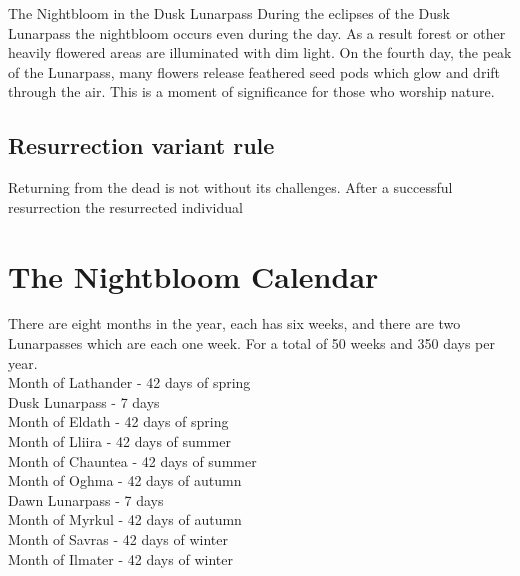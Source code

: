 \documentclass[10pt,twoside,twocolumn,openany,justified,bg=full,nomultitoc]{dndbook}
\begin{document}
\begin{commentbox}{The Nightbloom in the Dusk Lunarpass}\label{The-Nightbloom-in-the-Dusk-Lunarpass}
During the eclipses of the Dusk Lunarpass the nightbloom occurs even during the day. As a result forest or other heavily flowered areas are illuminated with dim light. On the fourth day, the peak of the Lunarpass, many flowers release feathered seed pods which glow and drift through the air. This is a moment of significance for those who worship nature.
\end{commentbox}

\subsection{Resurrection variant rule}
\label{sec-1-1-4}
Returning from the dead is not without its challenges. After a successful resurrection the resurrected individual 

\section{The Nightbloom Calendar}
\label{sec-1-2}
There are eight months in the year, each has six weeks, and there are two Lunarpasses which are each one week. For a total of 50 weeks and 350 days per year.\\
Month of Lathander - 42 days of spring\\
Dusk Lunarpass - 7 days\\
Month of Eldath - 42 days of spring\\
Month of Lliira - 42 days of summer\\
Month of Chauntea - 42 days of summer\\
Month of Oghma - 42 days of autumn\\
Dawn Lunarpass - 7 days\\
Month of Myrkul - 42 days of autumn\\
Month of Savras - 42 days of winter\\
Month of Ilmater - 42 days of winter\\
\end{document}
